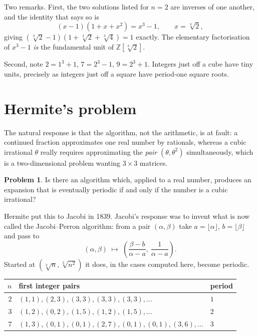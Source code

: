 \documentclass[12pt,a4paper]{article}
\theoremstyle{plain}
\theoremstyle{definition}
\newtheorem{problem}[theorem]{Problem}
\begin{document}
Two remarks. First, the two solutions listed for $n=2$ are inverses of one another, and the identity that says so is
\[
  (x-1)(1+x+x^2) = x^3-1 , \qquad x = \sqrt[3]{2},
\]
giving $(\sqrt[3]{2}-1)(1+\sqrt[3]{2}+\sqrt[3]{4}) = 1$ exactly. The elementary factorisation of $x^3-1$ \emph{is} the fundamental unit of $\mathbb{Z}[\sqrt[3]{2}]$.

Second, note $2 = 1^3+1$, $7 = 2^3-1$, $9 = 2^3+1$. Integers just off a cube have tiny units, precisely as integers just off a square have period-one square roots.

\section{Hermite's problem}

The natural response is that the algorithm, not the arithmetic, is at fault: a continued fraction approximates one real number by rationals, whereas a cubic irrational $\theta$ really requires approximating the \emph{pair} $(\theta, \theta^2)$ simultaneously, which is a two-dimensional problem wanting $3\times3$ matrices.

\begin{problem}
Is there an algorithm which, applied to a real number, produces an expansion that is eventually periodic if and only if the number is a cubic irrational?
\end{problem}

Hermite put this to Jacobi in 1839. Jacobi's response was to invent what is now called the Jacobi--Perron algorithm: from a pair $(\alpha,\beta)$ take $a = \lfloor\alpha\rfloor$, $b = \lfloor\beta\rfloor$ and pass to
\[
  (\alpha,\beta) \;\longmapsto\; \left( \frac{\beta-b}{\alpha-a},\ \frac{1}{\alpha-a} \right).
\]
Started at $(\sqrt[3]{n}, \sqrt[3]{n^2})$ it does, in the cases computed here, become periodic.

\begin{center}
\begin{tabular}{rll}
\toprule
$n$ & first integer pairs & period \\
\midrule
$2$ & $(1,1),(2,3),(3,3),(3,3),(3,3),\ldots$        & $1$ \\
$3$ & $(1,2),(0,2),(1,5),(1,2),(1,5),\ldots$        & $2$ \\
$7$ & $(1,3),(0,1),(0,1),(2,7),(0,1),(0,1),(3,6),\ldots$ & $3$ \\
\bottomrule
\end{tabular}
\end{center}
\end{document}
